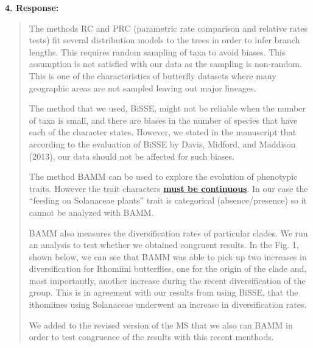 \documentclass[]{article}
\begin{document}
\textbf{4. Response:}

\begin{quote}
\color{blue}
The methods RC and PRC (parametric rate comparison and relative rates tests) 
fit several distribution models to the trees in order to
infer branch lengths. This requires random sampling of taxa to avoid biases.
This assumption is not satisfied with our data as the sampling is non-random.
This is one of the characteristics of butterfly datasets where many geographic
areas are not sampled leaving out major lineages.

The method that we used, BiSSE, might not be reliable when the number of
taxa is small, and there are biases in the number of species that have
each of the character states. However, we stated in the manuscript that
according to the evaluation of BiSSE by Davis, Midford, and Maddison
(2013), our data should not be affected for such biases.

The method BAMM can be used to explore the evolution of phenotypic
traits. However the trait characters
\href{http://bamm-project.org/configuration.html\#id5}{\textbf{must be
continuous}}. In our case the ``feeding on Solanaceae plants'' trait is
categorical (absence/presence) so it cannot be analyzed with BAMM.

BAMM also measures the diversification rates of particular clades. We
run an analysis to test whether we obtained congruent results. In the
Fig. 1, shown below, we can see that BAMM was able to pick up two
increases in diversification for Ithomiini butterflies, one for the
origin of the clade and, most importantly, another increase during the
recent diversification of the group. This is in agreement with our
results from using BiSSE, that the ithomiines using Solanaceae underwent
an increase in diversification rates.

We added to the revised version of the MS that we also ran BAMM in order to
test congruence of the results with this recent menthods.
\end{quote}
\end{document}
